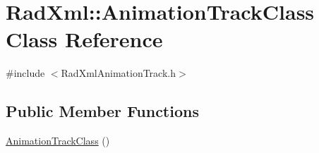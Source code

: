 \hypertarget{class_rad_xml_1_1_animation_track_class}{\section{Rad\-Xml\-:\-:Animation\-Track\-Class Class Reference}
\label{class_rad_xml_1_1_animation_track_class}
}


{\ttfamily \#include $<$Rad\-Xml\-Animation\-Track.\-h$>$}

\subsection*{Public Member Functions}
\begin{DoxyCompactItemize}
\item 
\hyperlink{class_rad_xml_1_1_animation_track_class_a90ae1ed9e5c99928ed0bd0b82636dfbb}{Animation\-Track\-Class} ()
\end{DoxyCompactItemize}

